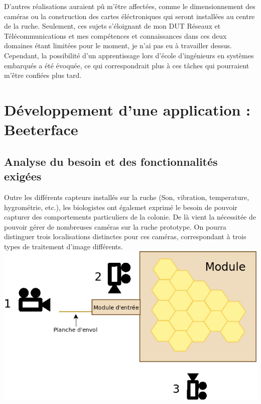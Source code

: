 \documentclass[11pt,french,a4paper]{report}
\begin{document}
D'autres réalisations auraient pû m'être affectées, comme le dimensionnement des caméras ou la construction des cartes éléctroniques
qui seront installées au centre de la ruche. Seulement, ces sujets s'éloignant de mon DUT Réseaux et Télécommunications et mes 
compétences et connaissances dans ces deux domaines étant limitées pour le moment, je n'ai pas eu à travailler dessus.\\

Cependant, la possibilité d'un apprentissage lors d'école d'ingénieurs en systèmes embarqués a été évoquée, ce qui correspondrait 
plus à ces tâches qui pourraient m'être confiées plus tard.\\



\chapter{Développement d'une application : Beeterface}

    \section{Analyse du besoin et des fonctionnalités exigées}

Outre les différents capteurs installés sur la ruche (Son, vibration, temperature, hygrométrie, etc.), 
les biologistes ont égalemet exprimé le besoin de pouvoir capturer des comportements particuliers de la colonie. 
De là vient la nécessitée de pouvoir gérer de nombreuses caméras sur la ruche prototype. 
On pourra distinguer trois localisations distinctes pour ces caméras, correspondant à trois types de traitement d'image différents. \\

\includegraphics[scale=0.3]{../images/dia/schema_camera.png}
\end{document}
